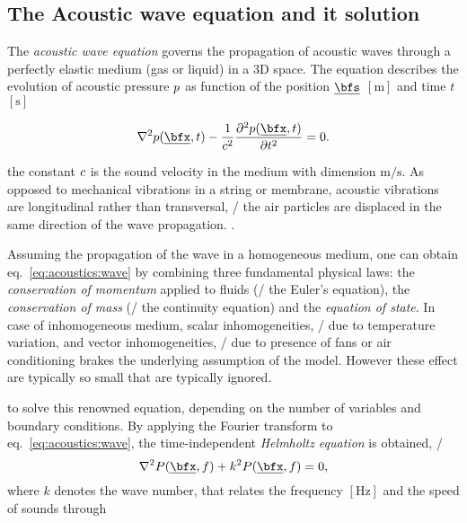 \subsection{The Acoustic wave equation and it solution}
\label{subsec:acoustics:waveq}

The \textit{acoustic wave equation} governs the propagation of acoustic waves through a perfectly elastic medium (gas or liquid) in a 3D space.
The equation describes the evolution of acoustic pressure $p$ as function of the position $\positionSource$ $[\si{\metre}]$ and time $t$ $[\si{\second}]$

\begin{equation}
    \label{eq:acoustics:wave}
    \knabla^2 \pressure(\positionMicrophone, t) - \frac{1}{\speedOfSound^2} \kpderiv[2]{\pressure(\positionMicrophone, t)}{t} = 0
    .
\end{equation}

the constant $c$ is the sound velocity in the medium with dimension $\si{\metre}/\si{\second}$.
As opposed to mechanical vibrations in a string or membrane, acoustic vibrations are longitudinal rather than transversal,
\ie/ the air particles are displaced in the same direction of the wave propagation.
.

Assuming the propagation of the wave in a homogeneous medium, one can obtain eq.~\cref{eq:acoustics:wave} by combining three fundamental physical laws:
the \textit{conservation of momentum} applied to fluids (\aka/ the Euler's equation),
the \textit{conservation of mass} (\aka/ the continuity equation) and the \textit{equation of state}.
In case of inhomogeneous medium, scalar inhomogeneities, \eg/ due to temperature variation,
and vector inhomogeneities, \eg/ due to presence of fans or air conditioning
brakes the underlying assumption of the model. However these effect are typically so small that are typically ignored.


 to solve this renowned equation, depending on the number of variables and boundary conditions.
By applying the Fourier transform to eq.~\cref{eq:acoustics:wave}, the time-independent \textit{Helmholtz equation} is obtained, \ie/
\begin{equation}
    \label{eq:acoustics:helmholtz}
    \knabla^2 P(\positionMicrophone, f) + k^2 P(\positionMicrophone, f) = 0
    ,
\end{equation}
where $k$ denotes the wave number, that relates the frequency $[\si{\hertz}]$ and the speed of sounds through

